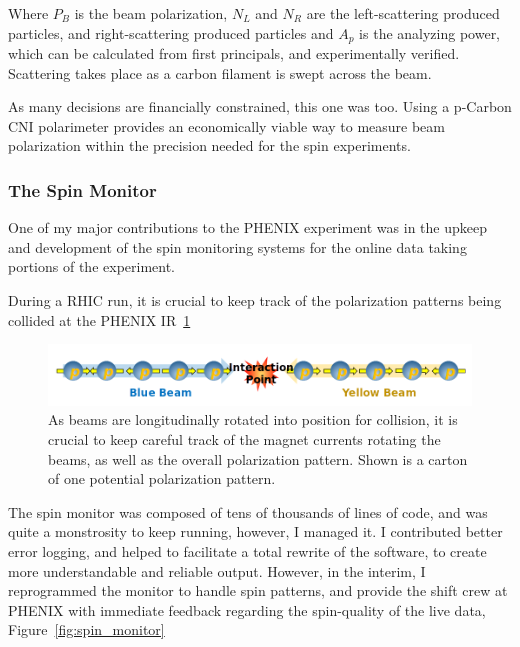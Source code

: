 Where $P_B$ is the beam polarization, $N_L$ and $N_R$ are the left-scattering
produced particles, and right-scattering produced particles and $A_p$ is the
analyzing power, which can be calculated from first principals, and
experimentally verified. Scattering takes place as a carbon filament is swept
across the beam.

As many decisions are financially constrained, this one was too. Using a
p-Carbon CNI polarimeter provides an economically viable way to measure beam
polarization within the precision needed for the spin experiments.

\subsubsection{The Spin Monitor}
\label{sec:the_spin_monitor}

One of my major contributions to the PHENIX experiment was in the upkeep and
development of the spin monitoring systems for the online data taking portions
of the experiment.

During a RHIC run, it is crucial to keep track of the polarization patterns
being collided at the PHENIX IR~\ref{fig:phenix_spin_collision}

\begin{figure}
  \centering
  \includegraphics[width=\linewidth]{./figures/phenix_spin_collision}
  \caption{
    As beams are longitudinally rotated into position for collision, it is
    crucial to keep careful track of the magnet currents rotating the beams, as
    well as the overall polarization pattern. Shown is a carton of one potential
    polarization pattern.
  }
  \label{fig:phenix_spin_collision}
\end{figure}

The spin monitor was composed of tens of thousands of lines of code, and was
quite a monstrosity to keep running, however, I managed it. I contributed better
error logging, and helped to facilitate a total rewrite of the software, to
create more understandable and reliable output. However, in the interim, I
reprogrammed the monitor to handle spin patterns, and provide the shift crew at
PHENIX with immediate feedback regarding the spin-quality of the live data,
Figure~\ref{fig:spin_monitor}

